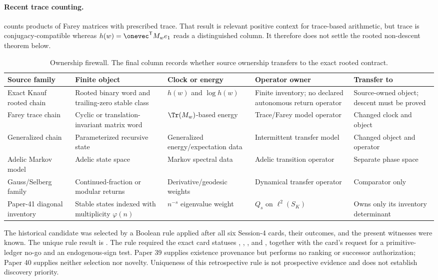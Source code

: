 \paragraph{Recent trace counting.}
\citet{technau2023farey} counts products of Farey matrices with prescribed
trace.  That result is relevant positive context for trace-based arithmetic,
but trace is conjugacy-compatible whereas
$h(w)=\onevec^{\mathsf T}M_we_1$ reads a distinguished column.  It therefore
does not settle the rooted non-descent theorem below.

\begin{table}[htbp]
\centering
\caption{Ownership firewall.  The final column records whether source
ownership transfers to the exact  rooted contract.}
\label{tab:ownership-firewall}
\scriptsize
\setlength{\tabcolsep}{3pt}
\begin{tabularx}{\textwidth}{@{}P{.14\textwidth}YYYY@{}}
\toprule
Source family & Finite object & Clock or energy & Operator owner & Transfer to
 \\
\midrule
Exact Knauf rooted chain
& Rooted binary word and trailing-zero stable class
& $h(w)$ and $\log h(w)$
& Finite inventory; no declared autonomous return operator
& Source-owned object; descent must be proved \\
Farey trace chain
& Cyclic or translation-invariant matrix word
& $\Tr(M_w)$-based energy
& Trace/Farey model operator
& Changed clock and object \\
Generalized chain
& Parameterized recursive state
& Generalized energy/expectation data
& Intermittent transfer model
& Changed object and operator \\
Adelic Markov model
& Adelic state space
& Markov spectral data
& Adelic transition operator
& Separate phase space \\
Gauss/Selberg family
& Continued-fraction or modular returns
& Derivative/geodesic weights
& Dynamical transfer operator
& Comparator only \\
Paper-41 diagonal inventory
& Stable states indexed with multiplicity $\varphi(n)$
& $n^{-s}$ eigenvalue weight
& $Q_s$ on $\ell^2(S_K)$
& Owns only its inventory determinant \\
\bottomrule
\end{tabularx}
\end{table}

The historical candidate was selected by a Boolean rule applied after all
six Session-4 cards, their outcomes, and the present witnesses were known.
The unique rule result is .  The rule required the exact card
statuses
, ,
, and , together with
the card's request for a primitive-ledger no-go and an endogenous-sign test.
Paper 39 supplies existence provenance but performs no ranking or successor
authorization; Paper 40 supplies neither selection nor novelty.  Uniqueness
of this retrospective rule is not prospective evidence and does not
establish discovery priority.

